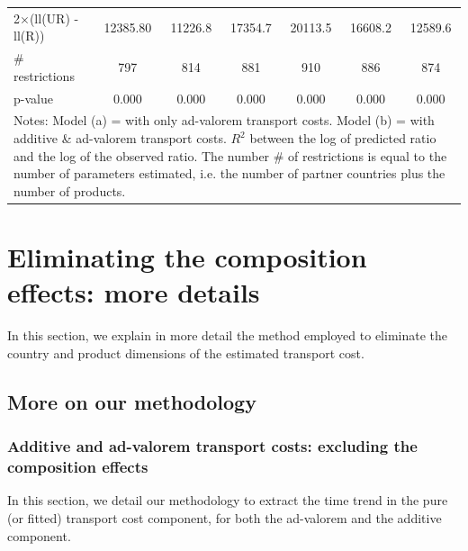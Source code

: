 \documentclass[a4paper,11pt]{article}
\begin{document}
\begin{table}[htbp]
\begin{center}
{\begin{tabular}{l|cccccc}
2$\times$(ll(UR) -ll(R)) & 12385.80 & 11226.8 & \multicolumn{1}{c}{17354.7} & \multicolumn{1}{c}{20113.5} & \multicolumn{1}{c}{16608.2} & \multicolumn{1}{c}{12589.6} \\
\# restrictions  & 797   & 814   & \multicolumn{1}{c}{881} & \multicolumn{1}{c}{910} & \multicolumn{1}{c}{886} & \multicolumn{1}{c}{874} \\
p-value & 0.000 & 0.000 & \multicolumn{1}{c}{0.000} & \multicolumn{1}{c}{0.000} & \multicolumn{1}{c}{0.000} & \multicolumn{1}{c}{0.000} \\
\hline\hline
\multicolumn{7}{l}{\parbox[l]{13cm}{ \vspace{7pt}\scriptsize{Notes: Model (a) = with only ad-valorem transport costs.
Model (b) = with additive \& ad-valorem
transport costs.
$R^{2}$ between the log of predicted ratio and the log of the observed ratio.
The number \# of restrictions is equal to the number of parameters estimated, i.e. the number of partner countries plus the number of products.}}}
\end{tabular}%
}
\end{center}
\end{table}%

\newpage


\clearpage
\setcounter{table}{0}
\setcounter{figure}{0}
\renewcommand{\thefigure}{D.\arabic{figure}}
\renewcommand{\thetable}{D.\arabic{table}}

\section{Eliminating the composition effects: more details \label{app:comp-effects}}

In this section, we explain in more detail the method employed to eliminate the country and product dimensions of the estimated transport cost.

\subsection{More on our methodology}


\subsubsection{Additive and ad-valorem transport costs: excluding the composition effects}

In this section, we detail our methodology to extract the time trend in the pure (or fitted) transport cost component, for both the ad-valorem and the additive component.
\end{document}
